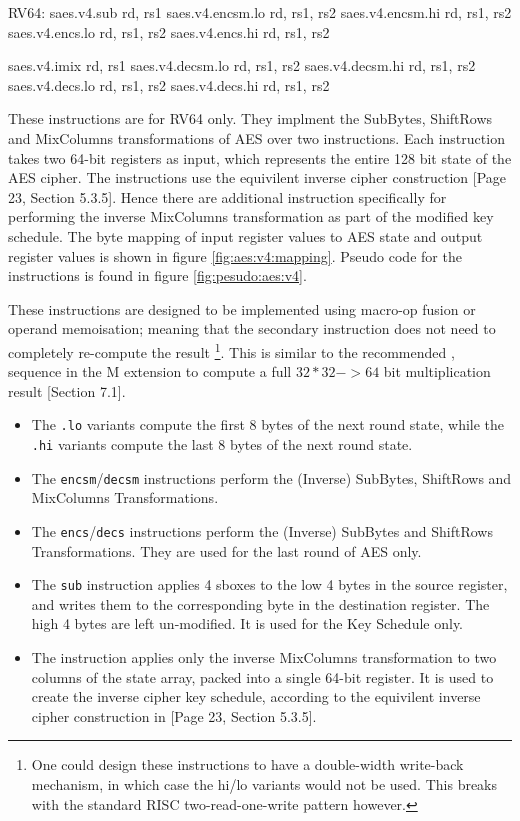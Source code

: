 \begin{cryptoisa}
RV64:
    saes.v4.sub      rd, rs1
    saes.v4.encsm.lo rd, rs1, rs2
    saes.v4.encsm.hi rd, rs1, rs2
    saes.v4.encs.lo  rd, rs1, rs2
    saes.v4.encs.hi  rd, rs1, rs2

    saes.v4.imix     rd, rs1
    saes.v4.decsm.lo rd, rs1, rs2
    saes.v4.decsm.hi rd, rs1, rs2
    saes.v4.decs.lo  rd, rs1, rs2
    saes.v4.decs.hi  rd, rs1, rs2
\end{cryptoisa}

These instructions are for RV64 only.
They implment the SubBytes, ShiftRows and MixColumns transformations of AES
over two instructions.
Each instruction takes two 64-bit registers as input, which represents
the entire 128 bit state of the AES cipher.
The instructions use the equivilent inverse cipher construction
\cite{nist:fips:197}[Page 23, Section 5.3.5].
Hence there are additional instruction specifically for performing the
inverse MixColumns transformation as part of the modified key schedule.
The byte mapping of input register values to AES state and output register
values is shown in figure \ref{fig:aes:v4:mapping}.
Pseudo code for the instructions is found in figure
\ref{fig:pesudo:aes:v4}.

These instructions are designed to be implemented using macro-op fusion or
operand memoisation; meaning that the secondary instruction does not
need to completely re-compute the result
\footnote{
One could design these instructions to have a double-width write-back
mechanism, in which case the hi/lo variants would not be used.
This breaks with the standard RISC two-read-one-write pattern however.
}.
This is similar to the recommended , 
sequence in the M extension to compute a full $32*32->64$ bit
multiplication result \cite{riscv:spec:user}[Section 7.1].

\begin{itemize}
\item
The {\tt *.lo} variants compute the first 8 bytes of the next round
state, while the {\tt *.hi} variants compute the last 8 bytes of the
next round state.
\item
The {\tt encsm}/{\tt decsm} instructions perform the (Inverse) SubBytes,
ShiftRows and MixColumns Transformations.
\item
The {\tt encs}/{\tt decs} instructions perform the (Inverse) SubBytes and
ShiftRows Transformations. They are used for the last round of AES only.
\item
The {\tt sub} instruction applies 4 sboxes to the low
4 bytes in the source register, and writes them to the corresponding
byte in the destination register.
The high 4 bytes are left un-modified.
It is used for the Key Schedule only.
\item
The  instruction applies only the inverse MixColumns
transformation to two columns of the state array, packed into a single
64-bit register.
It is used to create the inverse cipher key schedule, according to
the equivilent inverse cipher construction in
\cite{nist:fips:197}[Page 23, Section 5.3.5].
\end{itemize}

